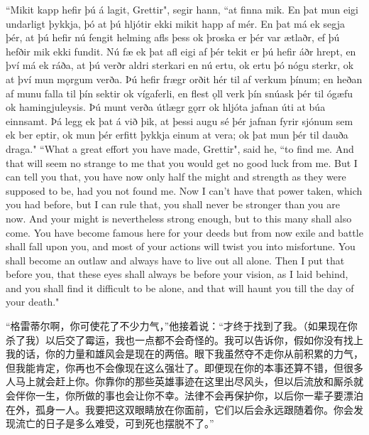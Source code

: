 \begin{paracol}{2}
    ``Mikit kapp hefir þú á lagit, Grettir", segir hann, ``at finna mik. En þat mun eigi undarligt þykkja, þó at þú hljótir ekki mikit happ af mér. En þat má ek segja þér, at þú hefir nú fengit helming afls þess ok þroska er þér var ætlaðr, ef þú hefðir mik ekki fundit. Nú fæ ek þat afl eigi af þér tekit er þú hefir áðr hrept, en því má ek ráða, at þú verðr aldri sterkari en nú ertu, ok ertu þó nógu sterkr, ok at því mun mǫrgum verða. Þú hefir frægr orðit hér til af verkum þínum; en heðan af munu falla til þín sektir ok vígaferli, en flest ǫll verk þín snúask þér til ógæfu ok hamingjuleysis. Þú munt verða útlægr gǫrr ok hljóta jafnan úti at búa einnsamt. Þá legg ek þat á við þik, at þessi augu sé þér jafnan fyrir sjónum sem ek ber eptir, ok mun þér erfitt þykkja einum at vera; ok þat mun þér til dauða draga."
    \switchcolumn
    ``What a great effort you have made, Grettir", said he, ``to find me. And that will seem no strange to me that you would get no good luck from me. But I can tell you that, you have now only half the might and strength as they were supposed to be, had you not found me. Now I can't have that power taken, which you had before, but I can rule that, you shall never be stronger than you are now. And your might is nevertheless strong enough, but to this many shall also come. You have become famous here for your deeds but from now exile and battle shall fall upon you, and most of your actions will twist you into misfortune. You shall become an outlaw and always have to live out all alone. Then I put that before you, that these eyes shall always be before your vision, as I laid behind, and you shall find it difficult to be alone, and that will haunt you till the day of your death."
\end{paracol}
\begin{translation*}{}
    “格雷蒂尔啊，你可使花了不少力气，”他接着说：“才终于找到了我。（如果现在你杀了我）以后交了霉运，我也一点都不会奇怪的。我可以告诉你，假如你没有找上我的话，你的力量和雄风会是现在的两倍。眼下我虽然夺不走你从前积累的力气，但我能肯定，你再也不会像现在这么强壮了。即便现在你的本事还算不错，但很多人马上就会赶上你。你靠你的那些英雄事迹在这里出尽风头，但以后流放和厮杀就会伴你一生，你所做的事也会让你不幸。法律不会再保护你，以后你一辈子要漂泊在外，孤身一人。我要把这双眼睛放在你面前，它们以后会永远跟随着你。你会发现流亡的日子是多么难受，可到死也摆脱不了。”
\end{translation*}
